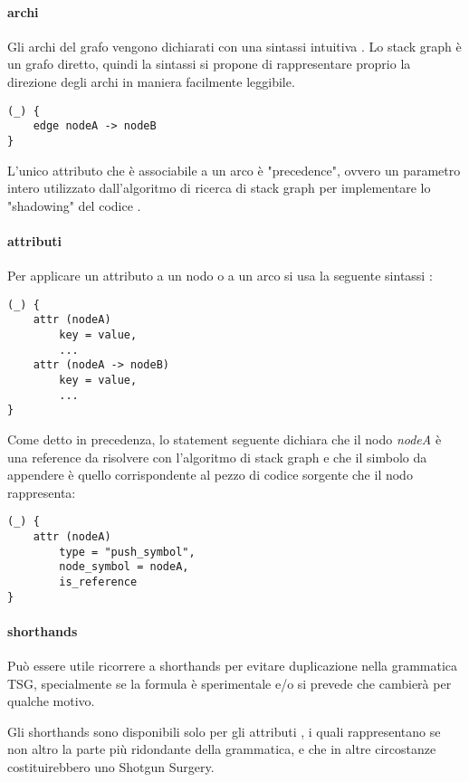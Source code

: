 \paragraph{archi}

Gli archi del grafo vengono dichiarati con una sintassi intuitiva \cite{TreeSitterGraphReferenceEdges}.
Lo stack graph \`e un grafo diretto, quindi la sintassi si propone di rappresentare proprio la direzione degli archi in maniera facilmente leggibile.

\begin{lstlisting}
(_) {
    edge nodeA -> nodeB
}
\end{lstlisting}

L'unico attributo che \`e associabile a un arco \`e "precedence", ovvero un parametro intero utilizzato dall'algoritmo di ricerca di stack graph per implementare lo "shadowing" del codice \cite{TreeSitterStackGraphEdges}.

\paragraph{attributi}

Per applicare un attributo a un nodo o a un arco si usa la seguente sintassi \cite{TreeSitterGraphReferenceAttributes}:

\begin{lstlisting}
(_) {
    attr (nodeA)
        key = value,
        ...
    attr (nodeA -> nodeB)
        key = value,
        ...
}
\end{lstlisting}

Come detto in precedenza, lo statement seguente dichiara che il nodo \emph{nodeA} \`e una reference da risolvere con l'algoritmo di stack graph e che il simbolo da appendere \`e quello corrispondente al pezzo di codice sorgente che il nodo rappresenta:

\begin{lstlisting}
(_) {
    attr (nodeA)
        type = "push_symbol",
        node_symbol = nodeA,
        is_reference
}
\end{lstlisting}

\paragraph{shorthands}
Pu\`o essere utile ricorrere a shorthands per evitare duplicazione nella grammatica TSG, specialmente se la formula \`e sperimentale e/o si prevede che cambier\`a per qualche motivo.

Gli shorthands sono disponibili solo per gli attributi \cite{TreeSitterGraphReferenceAttributeShorthands}, i quali rappresentano se non altro la parte pi\`u ridondante della grammatica, e che in altre circostanze costituirebbero uno Shotgun Surgery.

